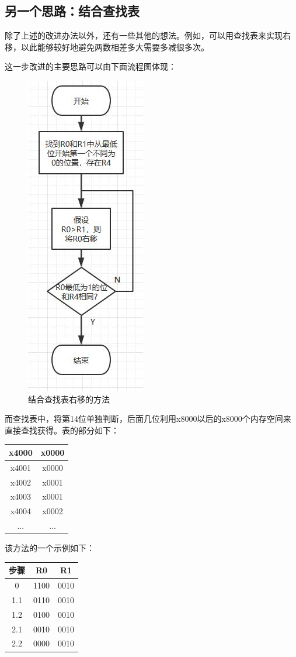 \documentclass[UTF8]{article}
\newcommand{\jumpLine} {\hspace*{\fill} \par}
\begin{document}
	\subsection{另一个思路：结合查找表}
	除了上述的改进办法以外，还有一些其他的想法。例如，可以用查找表来实现右移，以此能够较好地避免两数相差多大需要多减很多次。\par
	这一步改进的主要思路可以由下面流程图体现：\par
	\begin{figure}[H]
		\centering
		\includegraphics[width=0.3\linewidth]{process3.jpg}
		\caption{结合查找表右移的方法}
		\label{process3}
	\end{figure}\par
	而查找表中，将第14位单独判断，后面几位利用x8000以后的x8000个内存空间来直接查找获得。表的部分如下：\par
	\jumpLine
	\begin{tabular}{|c|c|}
		\hline 
		x4000 & x0000 \\ 
		\hline 
		x4001 & x0000 \\ 
		\hline 
		x4002 & x0001 \\ 
		\hline 
		x4003 & x0001 \\ 
		\hline 
		x4004 & x0002 \\ 
		\hline 
		... &  ... \\ 
		\hline 
	\end{tabular} \par
	该方法的一个示例如下：\par
	\begin{tabular}{|c|c|c|}
		\hline 
		步骤 & R0 & R1 \\ 
		\hline 
		0 & 1100 & 0010 \\ 
		\hline 
		1.1 & 0110 & 0010 \\ 
		\hline 
		1.2 & 0100 & 0010 \\ 
		\hline 
		2.1 & 0010 & 0010 \\ 
		\hline 
		2.2 & 0000 & 0010 \\ 
		\hline 
	\end{tabular} 
	
\end{document}
